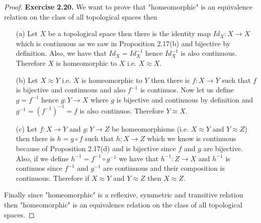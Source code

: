 \documentclass[11pt]{article}
\theoremstyle{definition}
\begin{document}
\begin{proof}{\textbf{Exercise 2.20.}}
    We want to prove that "homeomorphic" is an equivalence relation on the
    class of all topological spaces then
    \begin{itemize}
        \item [(a)] Let $X$ be a topological space then there is the identity
        map $Id_X: X \to X$ which is continuous as we saw in Proposition 2.17(b)
        and bijective by definition. Also, we have that $Id_X = Id_X^{-1}$
        hence $Id_X^{-1}$ is also continuous. Therefore $X$ is homeomorphic
        to $X$ i.e. $X \approx X$.

        \item [(b)] Let $X \approx Y$ i.e. $X$ is homeomorphic to $Y$ then
        there is $f:X \to Y$ such that $f$ is bijective and continuous and also
        $f^{-1}$ is continuos. Now let us define $g = f^{-1}$ hence
        $g: Y \to X$ where $g$ is bijective and continuous by definition and
        $g^{-1} = (f^{-1})^{-1} = f$ is also continuos. Therefore $Y \approx X$.

        \item [(c)] Let $f:X\to Y$ and $g:Y \to Z$ be homeomorphisms
        (i.e. $X \approx Y$ and $Y \approx Z$) then there is $h = g \circ f$
        such that $h: X \to Z$ which we know is continuous because of
        Proposition 2.17(d) and is bijective since $f$ and $g$ are bijective.
        Also, if we define $h^{-1} = f^{-1}\circ g^{-1}$ we have that
        $h^{-1}:Z \to X$ and $h^{-1}$ is continuos since $f^{-1}$ and $g^{-1}$
        are continuous and their composition is continuous. Therefore
        if $X \approx Y$ and $Y \approx Z$ then $X \approx Z$.
    \end{itemize}
    Finally since "homeomorphic" is a reflexive, symmetric and transitive
    relation then "homeomorphic" is an equivalence relation on the class of 
    all topological spaces.
\end{proof}
\end{document}
